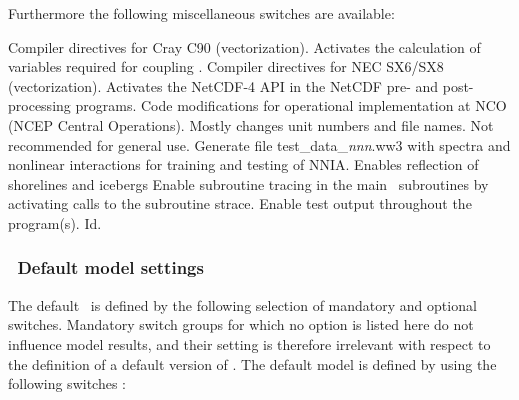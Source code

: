 \noindent
Furthermore the following miscellaneous switches are available:
\begin{slist}
 {Compiler directives for Cray C90 (vectorization).}
 {Activates the calculation of variables required for coupling}
.
 {Compiler directives for NEC SX6/SX8 (vectorization).}
 {Activates the NetCDF-4 API in the NetCDF pre- and post-processing programs.}
 {Code modifications for operational implementation at NCO
           (NCEP Central Operations). Mostly changes unit numbers
           and file names. Not recommended for general use.} 
 {Generate file test\_data\_{\it{nnn}}.ww3 with spectra and 
           nonlinear interactions for training and testing of NNIA}.
 {Enables reflection of shorelines and icebergs}
   {Enable subroutine tracing in the main \ws\
           subroutines by activating calls to the
           subroutine {\F strace}.}
   {Enable test output throughout the program(s).}
  {Id.}
\end{slist}


\vsssub
\subsubsection{~Default model settings} \label{sub:opt_default}
\vsssub
%
%
The default \ws\ is defined by the following selection of mandatory and
optional switches. Mandatory switch groups for which no option is listed here
do not influence model results, and their setting is therefore irrelevant with
respect to the definition of a default version of \ws. The default model is
defined by using the following switches :

